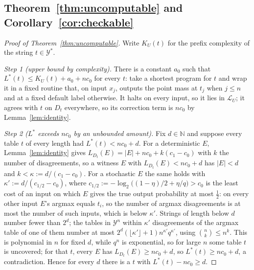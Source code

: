 \documentclass[11pt,letterpaper]{article}
\newcommand{\Y}{\mathcal{Y}}
\newcommand{\Lang}{\mathcal{L}}
\newcommand{\LU}{\Lang_{U}}
\newcommand{\D}{D}
\newcommand{\N}{\mathbb{N}}
\newcommand{\cz}{c_{0}}
\newcommand{\co}{c_{1}}
\newcommand{\Ltwo}{\log_{2}}
\theoremstyle{plain}
\theoremstyle{definition}
\theoremstyle{remark}
\begin{document}
\subsection{Theorem~\ref{thm:uncomputable} and Corollary~\ref{cor:checkable}}
\begin{proof}[Proof of Theorem~\ref{thm:uncomputable}]
Write $K_U(t)$ for the prefix complexity of the string $t\in\Y^{*}$.

\emph{Step 1 (upper bound by complexity).} There is a constant $a_0$ such that $L^{*}(t)\le K_U(t)+a_0+n\cz$ for every $t$: take a shortest program for $t$ and wrap it in a fixed routine that, on input $x_j$, outputs the point mass at $t_j$ when $j\le n$ and at a fixed default label otherwise. It halts on every input, so it lies in $\LU$; it agrees with $t$ on $\D_t$ everywhere, so its correction term is $n\cz$ by Lemma~\ref{lem:identity}.

\emph{Step 2 ($L^{*}$ exceeds $n\cz$ by an unbounded amount).} Fix $d\in\N$ and suppose every table $t$ of every length had $L^{*}(t)<n\cz+d$. For a deterministic $E$, Lemma~\ref{lem:identity} gives $L_{\D_t}(E)=|E|+n\cz+k(\co-\cz)$ with $k$ the number of disagreements, so a witness $E$ with $L_{\D_t}(E)<n\cz+d$ has $|E|<d$ and $k<\kappa:=d/(\co-\cz)$. For a stochastic $E$ the same holds with $\kappa':=d/(c_{1/2}-\cz)$, where $c_{1/2}:=-\Ltwo\big((1-\eta)/2+\eta/q\big)>\cz$ is the least cost of an input on which $E$ gives the true output probability at most $\frac12$: on every other input $E$'s argmax equals $t_i$, so the number of argmax disagreements is at most the number of such inputs, which is below $\kappa'$. Strings of length below $d$ number fewer than $2^{d}$; the tables in $\Y^{n}$ within $\kappa'$ disagreements of the argmax table of one of them number at most $2^{d}(\lfloor\kappa'\rfloor+1)n^{\kappa'}q^{\kappa'}$, using $\binom nk\le n^{k}$. This is polynomial in $n$ for fixed $d$, while $q^{n}$ is exponential, so for large $n$ some table $t$ is uncovered; for that $t$, every $E$ has $L_{\D_t}(E)\ge n\cz+d$, so $L^{*}(t)\ge n\cz+d$, a contradiction. Hence for every $d$ there is a $t$ with $L^{*}(t)-n\cz\ge d$.


\end{proof}
\end{document}
